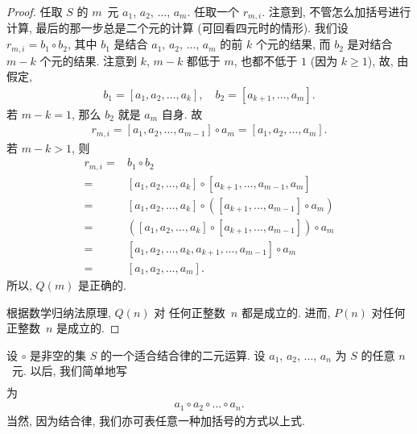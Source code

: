 \documentclass[%
    UTF8,%
    fontset=none,%
    punct=kaiming,%
    zihao=-4,%
    a4paper,%
    oneside,%
]{ctexbook}
\renewcommand*{\geq}{\geqslant}
\begin{document}
\begin{proof}
    任取 \(S\) 的 \(m\)~元
    \(a_1\), \(a_2\), \(\dots\), \(a_m\).
    任取一个 \(r_{m,i}\).
    注意到, 不管怎么加括号进行计算,
    最后的那一步总是二个元的计算
    (可回看四元时的情形).
    我们设 \(r_{m,i} = b_1 \circ b_2\),
    其中 \(b_1\) 是结合 \(a_1\), \(a_2\), \(\dots\), \(a_m\)
    的前 \(k\) 个元的结果,
    而 \(b_2\) 是对结合 \(m-k\) 个元的结果.
    注意到 \(k\), \(m-k\) 都低于 \(m\),
    也都不低于 \(1\)
    (因为 \(k \geq 1\)),
    故, 由假定,
    \begin{align*}
        b_1 = [a_1, a_2, \dots, a_k],
        \quad
        b_2 = [a_{k+1}, \dots, a_m].
    \end{align*}
    若 \(m - k = 1\), 那么 \(b_2\) 就是 \(a_m\) 自身.
    故
    \begin{align*}
        r_{m,i}
            = [a_1, a_2, \dots, a_{m-1}] \circ a_m
        = [a_1, a_2, \dots, a_m].
    \end{align*}
    若 \(m - k > 1\), 则
    \begin{align*}
        r_{m,i}
        = {} &
        b_1 \circ b_2
        \\
        = {} &
        [a_1, a_2, \dots, a_k] \circ
        [a_{k+1}, \dots, a_{m-1}, a_m]
        \\
        = {} &
        [a_1, a_2, \dots, a_k] \circ
        ([a_{k+1}, \dots, a_{m-1}] \circ a_m)
        \\
        = {} &
        ([a_1, a_2, \dots, a_k] \circ
        [a_{k+1}, \dots, a_{m-1}]) \circ a_m
        \\
        = {} &
        [a_1, a_2, \dots, a_k, a_{k+1}, \dots, a_{m-1}]
        \circ a_m
        \\
        = {} &
        [a_1, a_2, \dots, a_m].
    \end{align*}
    所以, \(Q(m)\) 是正确的.

    根据数学归纳法原理, \(Q(n)\) 对%
    任何正整数~\(n\) 都是成立的.
    进而, \(P(n)\) 对任何正整数~\(n\) 是成立的.
\end{proof}

设 \(\circ\) 是非空的集 \(S\) 的一个适合结合律的二元运算.
设 \(a_1\), \(a_2\), \(\dots\), \(a_n\) 为 \(S\) 的任意 \(n\)~元.
以后, 我们简单地写
\begin{align*}
    [a_1, a_2, \dots, a_n]
\end{align*}
为
\begin{align*}
    a_1 \circ a_2 \circ \dots \circ a_n.
\end{align*}
当然, 因为结合律, 我们亦可表任意一种加括号的方式以上式.
\end{document}
